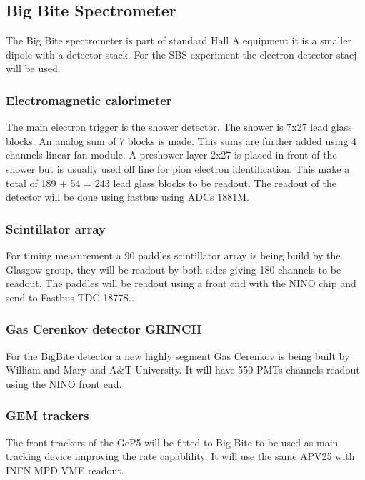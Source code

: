 \documentclass{article}
\begin{document}
\subsection{Big Bite Spectrometer}
The Big Bite spectrometer is part of standard Hall A equipment it is a smaller dipole with a detector stack. 
For the SBS experiment the electron detector stacj will be used.
\subsubsection{Electromagnetic calorimeter}
The main electron trigger is the shower detector. The shower is 7x27 lead glass blocks. An analog sum of 7 blocks is made. This sums are further added using 4 channels linear fan module.
A preshower layer 2x27 is placed in front of the shower but is usually used off line for pion electron identification. This make a total of 189 + 54 = 243 lead glass blocks to be readout.
The readout of the detector will be done using fastbus using ADCs 1881M.
\subsubsection{Scintillator array}
For timing measurement a 90 paddles scintillator array is being build by the Glasgow group, they will be readout by both sides giving 180 channels to be readout. The paddles will be readout using a front end with the NINO chip and send to Fastbus TDC 1877S..
\subsubsection{Gas Cerenkov detector GRINCH}
For the BigBite detector a new highly segment Gas Cerenkov is being built by William and Mary and A\&T University. It will have 550 PMTs channels readout using the NINO front end.
\subsubsection{GEM trackers}
The front trackers of the GeP5 will be fitted to Big Bite to be used as main tracking device improving the rate capablility. It will use the same APV25 with INFN MPD VME readout.
\end{document}
